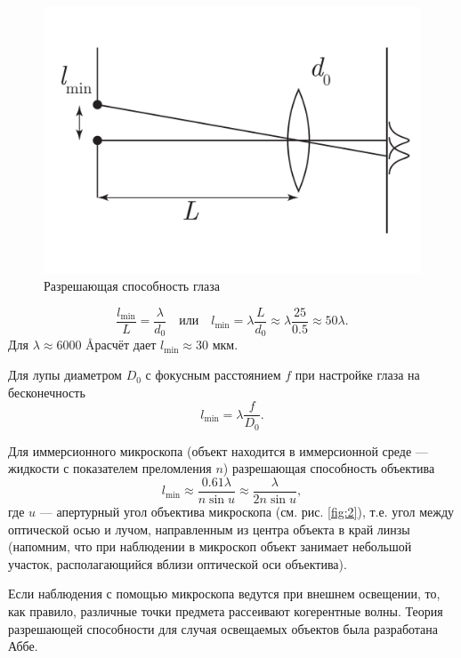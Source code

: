 \documentclass[a4paper, 12pt]{article}
\begin{document}
	\begin{figure}
		\includegraphics[scale=0.2]{fig1.pdf}
		\caption{Разрешающая способность глаза}
		\label{fig:1}
	\end{figure}
	\begin{equation*}
		\frac{l_{\min}}{L}=\frac{\lambda}{d_0}\quad\text{или}\quad l_{\min}=\lambda\frac{L}{d_0}\approx\lambda\frac{25}{0.5}\approx 50\lambda.
	\end{equation*}
	Для $\lambda\approx 6000$ \AA расчёт дает $l_{\min}\approx 30$ мкм.\par
	Для лупы диаметром $D_0$ с фокусным расстоянием $f$ при настройке глаза на бесконечность
	\begin{equation*}
		l_{\min}=\lambda\frac{f}{D_0}.
	\end{equation*}\par
	Для иммерсионного микроскопа (объект находится в иммерсионной среде — жидкости с показателем преломления $n$) разрешающая способность объектива
	\begin{equation*}
		l_{\min}\approx\frac{0.61\lambda}{n\sin u}\approx \frac{\lambda}{2n\sin u},
	\end{equation*}
	где $u$ — апертурный угол объектива микроскопа (см. рис. \ref{fig:2}), т.е. угол между оптической осью и лучом, направленным из центра объекта в край линзы (напомним, что при наблюдении в микроскоп объект занимает небольшой участок, располагающийся вблизи оптической оси объектива).\par
	Если наблюдения с помощью микроскопа ведутся при внешнем освещении, то, как правило, различные точки предмета рассеивают когерентные волны. Теория разрешающей способности для случая освещаемых объектов была разработана Аббе.\par
\end{document}
